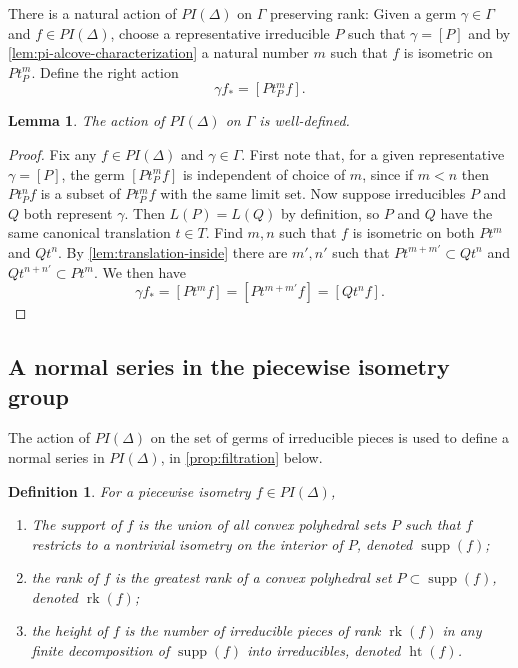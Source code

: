 \documentclass[11pt]{amsart}
\newtheorem{lemma}[theorem]{Lemma}
\newtheorem{definition}[theorem]{Definition}
\numberwithin{table}{section}
\numberwithin{figure}{section}
\theoremstyle{remark}
\DeclareMathOperator{\rk}{rk}
\DeclareMathOperator{\supp}{supp}
\DeclareMathOperator{\height}{ht}
\begin{document}
There is a natural action of $PI(\Delta)$ on $\Gamma$ preserving rank:
Given a germ $\gamma\in \Gamma$ and $f\in PI(\Delta)$, choose a
representative irreducible $P$ such that $\gamma = [P]$ and by
\cref{lem:pi-alcove-characterization} a natural number $m$ such that
$f$ is isometric on $P t_P^m$. Define the right action
\[
  \gamma f_\ast = [ P t_P^m f ].
\]

\begin{lemma}
  The action of $PI(\Delta)$ on $\Gamma$ is well-defined.
\end{lemma}
\begin{proof}
  Fix any $f\in PI(\Delta)$ and $\gamma\in \Gamma$. First note that,
  for a given representative $\gamma = [P]$, the germ
  $[ P t_P^m f ]$ is independent of choice of $m$, since if $m<n$
  then $P  t_P^n f$ is a subset of $P t_P^m f$ with the same
  limit set. Now suppose irreducibles $P$ and $Q$ both represent
  $\gamma$. Then $L(P) = L(Q)$ by definition, so $P$ and $Q$ have the
  same canonical translation $t\in T$. Find $m,n$ such that $f$ is
  isometric on both $P t^m$ and $Q t^n$. By
  \cref{lem:translation-inside} there are $m', n'$ such that
  $P t^{m+m'} \subset Q t^n$ and $Q t^{n+n'} \subset P t^m$. We
  then have
  \[ \gamma f_\ast = [P t^m f ] = [P t^{m+m'} f ] = [ Q t^n f ].
  \]
\end{proof}


\subsection{A normal series in the piecewise isometry group}

The action of $PI(\Delta)$ on the set of germs of irreducible pieces is
used to define a normal series in $PI(\Delta)$, in \cref{prop:filtration} below.

\begin{definition} \label{def:ranksuppheight}
  For a piecewise isometry $f\in PI(\Delta)$,
  \begin{enumerate}
  \item The {\em support} of $f$ is the union of all convex polyhedral
    sets $P$ such that $f$ restricts to a nontrivial isometry on the
    interior of $P$, denoted $\supp(f)$;
  \item the {\em rank} of $f$ is the greatest rank of a
    convex polyhedral set $P\subset \supp(f)$, denoted $\rk(f)$;
  \item the {\em height} of $f$ is the number of irreducible pieces of
    rank $\rk(f)$ in any finite decomposition of $\supp(f)$ into
    irreducibles, denoted $\height(f)$.
  \end{enumerate}
\end{definition}
\end{document}
